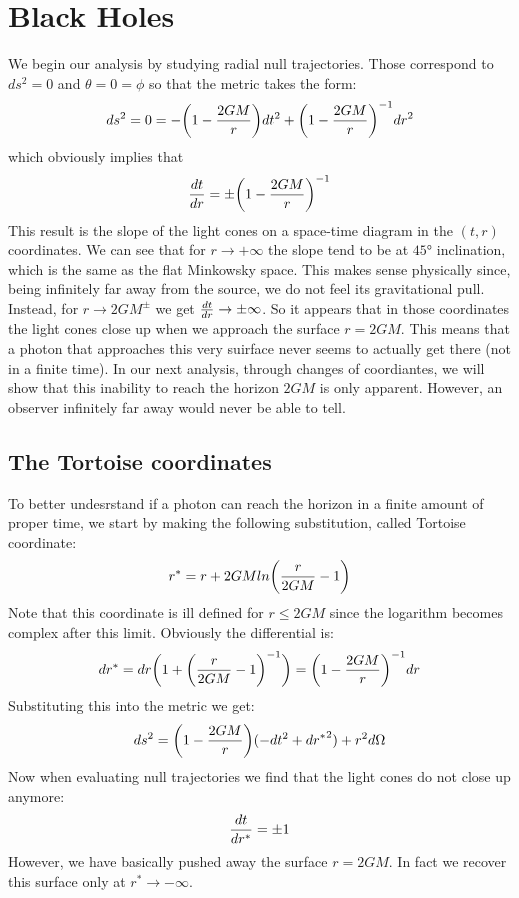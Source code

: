 \documentclass[]{article}
\theoremstyle{definition}
\theoremstyle{Theorem}
\theoremstyle{definition}
\theoremstyle{definition}
\theoremstyle{definition}
\begin{document}
\section{Black Holes}
We begin our analysis by studying radial null trajectories. Those correspond to $ds^2=0$ and $\theta=0=\phi$ so that the metric takes the form:
$$ds^2=0=-\bigg(1-{2GM\over r}\bigg)dt^2+\bigg(1-{2GM\over r}\bigg)^{-1}dr^2$$ 
which obviously implies that
$${dt\over dr}=\pm \bigg(1-{2GM\over r}\bigg)^{-1}$$
This result is the slope of the light cones on a space-time diagram in the $(t,r)$ coordinates. We can see that for $r\rightarrow+\infty$ the slope tend to be at $45°$ inclination, which is the same as the flat Minkowsky space. This makes sense physically since, being infinitely far away from the source, we do not feel its gravitational pull. Instead, for $r\rightarrow 2GM^\pm$ we get ${dt\over dr}\rightarrow\pm\infty$. So it appears that in those coordinates the light cones close up when we approach the surface $r=2GM$. This means that a photon that approaches this very suirface never seems to actually get there (not in a finite time). In our next analysis, through changes of coordiantes, we will show that this inability to reach the horizon $2GM$ is only apparent. However, an observer infinitely far away would never be able to tell.
\subsection{The Tortoise coordinates}
To better undesrstand if a photon can reach the horizon in a finite amount of proper time, we start by making the following substitution, called Tortoise coordinate:
$$r^*=r+2GMln\bigg({r\over 2GM}-1\bigg)$$
Note that this coordinate is ill defined for $r\leq2GM$ since the logarithm becomes complex after this limit.
Obviously the differential is:
$$dr^*=dr\bigg(1+\bigg({r\over 2GM}-1\bigg)^{-1}\bigg)=\bigg(1-{2GM\over r}\bigg)^{-1}dr$$
Substituting this into the metric we get:
$$ds^2=\bigg(1-{2GM\over r}\bigg)(-dt^2+{dr^*}^2)+r^2d\Omega$$
Now when evaluating null trajectories we find that the light cones do not close up anymore:
$${dt\over {dr^*}}=\pm1$$
However, we have basically pushed away the surface $r=2GM$. In fact we recover this surface only at $r^*\rightarrow -\infty$.
\end{document}
